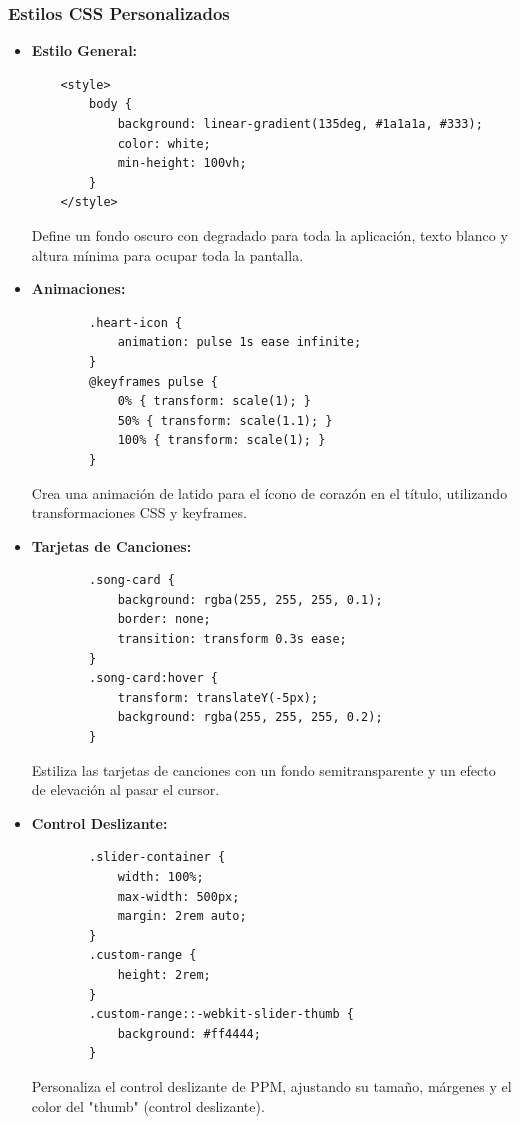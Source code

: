 \documentclass[a4paper,12pt]{article}
\begin{document}
\subsubsection{Estilos CSS Personalizados}
\begin{itemize}
    \item \textbf{Estilo General:}
    \begin{verbatim}
    <style>
        body {
            background: linear-gradient(135deg, #1a1a1a, #333);
            color: white;
            min-height: 100vh;
        }
    </style>
    \end{verbatim}
    Define un fondo oscuro con degradado para toda la aplicación, texto blanco y altura mínima para ocupar toda la pantalla.

    \item \textbf{Animaciones:}
    \begin{verbatim}
        .heart-icon {
            animation: pulse 1s ease infinite;
        }
        @keyframes pulse {
            0% { transform: scale(1); }
            50% { transform: scale(1.1); }
            100% { transform: scale(1); }
        }
    \end{verbatim}
    Crea una animación de latido para el ícono de corazón en el título, utilizando transformaciones CSS y keyframes.

    \item \textbf{Tarjetas de Canciones:}
    \begin{verbatim}
        .song-card {
            background: rgba(255, 255, 255, 0.1);
            border: none;
            transition: transform 0.3s ease;
        }
        .song-card:hover {
            transform: translateY(-5px);
            background: rgba(255, 255, 255, 0.2);
        }
    \end{verbatim}
    Estiliza las tarjetas de canciones con un fondo semitransparente y un efecto de elevación al pasar el cursor.

    \item \textbf{Control Deslizante:}
    \begin{verbatim}
        .slider-container {
            width: 100%;
            max-width: 500px;
            margin: 2rem auto;
        }
        .custom-range {
            height: 2rem;
        }
        .custom-range::-webkit-slider-thumb {
            background: #ff4444;
        }
    \end{verbatim}
    Personaliza el control deslizante de PPM, ajustando su tamaño, márgenes y el color del "thumb" (control deslizante).
\end{itemize}
\end{document}
